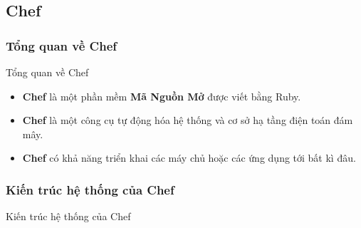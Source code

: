 \documentclass[14pt]{beamer}
\begin{document}
\subsection{Chef}
\subsubsection*{Tổng quan về Chef}

\begin{frame}{Tổng quan về Chef}
\renewcommand{\baselinestretch}{1.50}\normalsize
  \begin{itemize}
    \item \textbf{Chef} là một phần mềm \textbf{Mã Nguồn Mở} được viết bằng Ruby.
    \pause
    \item \textbf{Chef} là một công cụ tự động hóa hệ thống và cơ sở hạ tầng điện toán đám mây.
    \pause
    \item \textbf{Chef} có khả năng triển khai các máy chủ hoặc các ứng dụng tới bất kì đâu.
  \end{itemize}
\renewcommand{\baselinestretch}{1.0}\normalsize
\end{frame}

\subsubsection*{Kiến trúc hệ thống của Chef}
\begin{frame}{Kiến trúc hệ thống của Chef}
  \begin{center}
  \end{center}
\end{frame}
\end{document}
